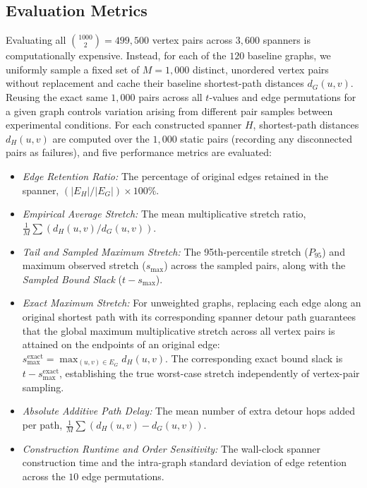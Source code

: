 \documentclass[conference]{IEEEtran}
\begin{document}
\subsection{Evaluation Metrics}
Evaluating all $\binom{1000}{2} = 499,500$ vertex pairs across $3,600$ spanners is computationally expensive. Instead, for each of the $120$ baseline graphs, we uniformly sample a fixed set of $M = 1,000$ distinct, unordered vertex pairs without replacement and cache their baseline shortest-path distances $d_G(u, v)$. Reusing the exact same $1,000$ pairs across all $t$-values and edge permutations for a given graph controls variation arising from different pair samples between experimental conditions.
For each constructed spanner $H$, shortest-path distances $d_H(u, v)$ are computed over the $1,000$ static pairs (recording any disconnected pairs as failures), and five performance metrics are evaluated:
\begin{itemize}
    \item \textit{Edge Retention Ratio:} The percentage of original edges retained in the spanner, $(|E_H| / |E_G|) \times 100\%$.
    \item \textit{Empirical Average Stretch:} The mean multiplicative stretch ratio, $\frac{1}{M} \sum (d_H(u, v) / d_G(u, v))$.
    \item \textit{Tail and Sampled Maximum Stretch:} The 95th-percentile stretch ($P_{95}$) and maximum observed stretch ($s_{\max}$) across the sampled pairs, along with the \textit{Sampled Bound Slack} ($t - s_{\max}$).
    \item \textit{Exact Maximum Stretch:} For unweighted graphs, replacing each edge along an original shortest path with its corresponding spanner detour path guarantees that the global maximum multiplicative stretch across all vertex pairs is attained on the endpoints of an original edge: $s_{\max}^{\mathrm{exact}} = \max_{(u,v)\in E_G} d_H(u,v)$. The corresponding exact bound slack is $t - s_{\max}^{\mathrm{exact}}$, establishing the true worst-case stretch independently of vertex-pair sampling.
    \item \textit{Absolute Additive Path Delay:} The mean number of extra detour hops added per path, $\frac{1}{M} \sum (d_H(u, v) - d_G(u, v))$.
    \item \textit{Construction Runtime and Order Sensitivity:} The wall-clock spanner construction time and the intra-graph standard deviation of edge retention across the $10$ edge permutations.
\end{itemize}
\end{document}

